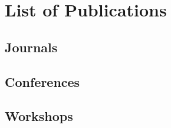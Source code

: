 \chapter*{List of Publications}
\label{publications}



\section*{Journals}

\begin{etaremune}
  {\small
    \item \ralovercoming
    \item \ralsampling
    \item \trodynamic
    \item \tcdsactive
  }
\end{etaremune}

\section*{Conferences}

\begin{etaremune}
  {\small
    \item \rssdemo
    \item \mrsmulti
    \item \icraautotuning
    \item \icracoupled
  }
\end{etaremune}

\section*{Workshops}

\begin{etaremune}
  {\small
    \item \irosbench
  }
\end{etaremune}






